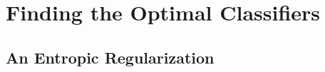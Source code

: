 \section{Finding the Optimal Classifiers}
\label{sec:algo}

\subsection{An Entropic Regularization}
\label{sec:entropic-reg}



